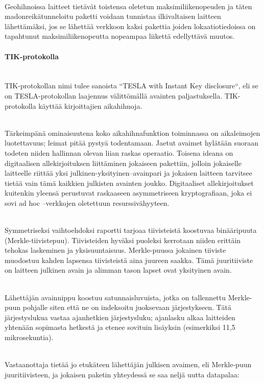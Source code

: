 \documentclass[finnish]{tktltiki2}
\theoremstyle{definition}
\theoremstyle{remark}
\begin{document}
\noindent \\
Geohihnoissa laitteet tietävät toistensa oletetun maksimiliikenopeuden ja täten madonreikätunneloitu paketti voidaan tunnistaa ilkivaltaisen laitteen lähettämäksi, jos se lähettää verkkoon kaksi pakettia joiden lokaatiotiedoissa on tapahtunut maksimiliikenopeutta nopeampaa liikettä edellyttävä muutos.

\paragraph{TIK-protokolla} 
\noindent \\
TIK-protokollan nimi tulee sanoista ``TESLA with Instant Key disclosure``, eli se on TESLA-protokollan laajennus välittömällä avainten paljastuksella. TIK-protokolla käyttää kirjoittajien aikahihnoja.

\noindent \\
Tärkeimpänä ominaisuutena koko aikahihnafunktion toiminnassa on aikaleimojen luotettavuus; leimat pitää pystyä todentamaan. Jaetut avaimet hylätään suoraan todeten niiden hallinnan olevan liian raskas operaatio. Toisena ideana on digitaalisen allekirjoituksen liittäminen jokaiseen pakettiin, jolloin jokaiselle laitteelle riittää yksi julkinen-yksityinen–avainpari ja jokaisen laitteen tarvitsee tietää vain tämä kaikkien julkisten avainten joukko. Digitaaliset allekirjoitukset kuitenkin yleensä perustuvat raskaaseen asymmetriseen kryptografiaan, joka ei sovi ad hoc –verkkojen oletettuun resurssivähyyteen.

\noindent \\
Symmetriseksi vaihtoehdoksi raportti tarjoaa tiivisteistä koostuvaa binääripuuta (Merkle-tiivistepuu). Tiivisteiden hyväksi puoleksi kerrotaan niiden erittäin tehokas laskeminen ja yksisuuntaisuus. Merkle-puussa jokainen tiiviste muodostuu kahden lapsensa tiivisteistä aina juureen saakka. Tämä juuritiiviste on laitteen julkinen avain ja alimman tason lapset ovat yksityinen avain.

\noindent \\
Lähettäjän avainnippu koostuu satunnaisluvuista, jotka on tallennettu Merkle-puun pohjalle siten että ne on indeksoitu juoksevaan järjestykseen. Tätä järjestyslukua vastaa ajanhetkien järjestysluku; ajanlasku alkaa laitteiden yhtenään sopimasta hetkestä ja etenee sovituin lisäyksin (esimerkiksi 11,5 mikrosekuntia). 

\noindent \\
Vastaanottaja tietää jo etukäteen lähettäjän julkisen avaimen, eli Merkle-puun juuritiivisteen, ja jokaisen paketin yhteydessä se saa neljä uutta datapalaa:
\end{document}
